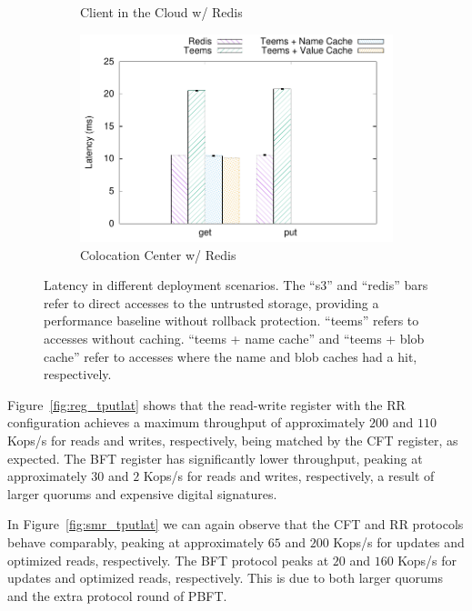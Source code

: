 \begin{figure}[t]
\begin{subfigure}[t]{0.24 * 10cm}
        \caption{Client in the Cloud w/ Redis}\label{fig:cloud_client_remote_redis}
    \end{subfigure}
    \begin{subfigure}[t]{0.24 * 10cm}
        \centering
        \includegraphics[width=\linewidth]{teem_results/deployment/result/collocation_center}
        \caption{Colocation Center w/ Redis}\label{fig:coloc_redis}
    \end{subfigure}
    \caption{Latency in different deployment scenarios. The
    ``s3'' and ``redis'' bars refer to direct accesses to the
    untrusted storage, providing a performance baseline without
    rollback protection. ``teems'' refers to accesses without
    caching. ``teems + name cache'' and ``teems +
    blob cache'' refer to accesses where the name and blob
    caches had a hit, respectively.}
\end{figure}
%
Figure~\ref{fig:reg_tputlat} shows that
the read-write register with the \ac{RR} configuration achieves a maximum
throughput of approximately $200$ and $110$ Kops/s for reads and
writes, respectively, being matched by the \ac{CFT} register, as
expected. The \ac{BFT} register has significantly lower throughput,
peaking at approximately $30$ and $2$ Kops/s for reads and
writes, respectively, a result of larger quorums and expensive
digital signatures.

In Figure~\ref{fig:smr_tputlat} we can again observe that the \ac{CFT} and
\ac{RR} protocols behave comparably, peaking at
approximately $65$ and $200$ Kops/s for updates and optimized
reads, respectively. The \ac{BFT} protocol peaks at $20$ and $160$
Kops/s for updates and optimized reads, respectively. This is due
to both larger quorums and the extra protocol round of PBFT.

